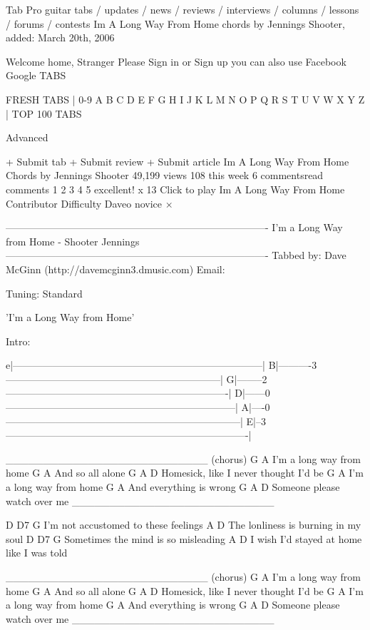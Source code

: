 
Tab Pro
guitar tabs / updates / news / reviews / interviews / columns / lessons / forums / contests
Im A Long Way From Home chords by Jennings Shooter, added: March 20th, 2006	
		
Welcome home, Stranger
Please Sign in or Sign up
you can also use
Facebook
Google
TABS
	
	
FRESH TABS | 0-9 A B C D E F G H I J K L M N O P Q R S T U V W X Y Z | TOP 100 TABS
	
Advanced
	
	+ Submit tab
+ Submit review
+ Submit article
Im A Long Way From Home Chords
by Jennings Shooter
49,199 views 108 this week
6 commentsread comments
1
2
3
4
5
excellent!
x 13
Click to play
Im A Long Way From Home
Contributor
Difficulty
Daveo
novice
×

-------------------------------------------------------------------------------
                        I'm a Long Way from Home - Shooter Jennings
-------------------------------------------------------------------------------
Tabbed by: Dave McGinn (http://davemcginn3.dmusic.com)
Email: 

Tuning: Standard


'I'm a Long Way from Home'


Intro:

e|---------------------------------------------------------------------------|
B|----------3-----------------------------------------------------------------|
G|--------2-------------------------------------------------------------------|
D|------0---------------------------------------------------------------------|
A|----0-----------------------------------------------------------------------|
E|--3-------------------------------------------------------------------------|

___________________________
(chorus)
       G   A
I'm a long way from home
G      A
 And so all alone
G                 A                 D
 Homesick, like I never thought I'd be
       G   A
I'm a long way from home
G         A
 And everything is wrong
G               A          D
 Someone please watch over me
___________________________


D       D7                  G
I'm not accustomed to these feelings
A                               D
 The lonliness is burning in my soul
D             D7          G
Sometimes the mind is so misleading
A                                    D
I wish I'd stayed at home like I was told


___________________________
(chorus)
       G   A
I'm a long way from home
G      A
 And so all alone
G                 A                 D
 Homesick, like I never thought I'd be
       G   A
I'm a long way from home
G         A
 And everything is wrong
G               A          D
 Someone please watch over me
___________________________



